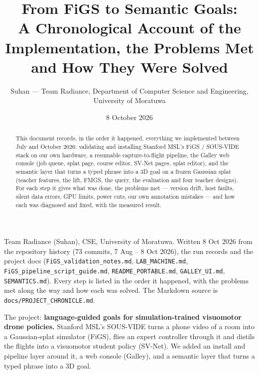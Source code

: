 \documentclass[11pt,a4paper]{article}
\title{From FiGS to Semantic Goals:\\[2pt]
\large A Chronological Account of the Implementation, the Problems Met and How They Were Solved}
\author{Suhan --- Team Radiance, Department of Computer Science and Engineering,\\University of Moratuwa}
\date{8 October 2026}
\newcommand{\code}[1]{\texttt{#1}}
\begin{document}
\maketitle
\begin{abstract}
This document records, in the order it happened, everything we implemented between July and October 2026: validating
and installing Stanford MSL's FiGS / SOUS-VIDE stack on our own hardware, a resumable capture-to-flight pipeline, the
Galley web console (job queue, splat page, course editor, SV-Net pages, splat editor), and the semantic layer that turns
a typed phrase into a 3D goal on a frozen Gaussian splat (teacher features, the lift, FMGS, the query, the evaluation
and four teacher designs). For each step it gives what was done, the problems met --- version drift, host faults,
silent data errors, GPU limits, power cuts, our own annotation mistakes --- and how each was diagnosed and fixed, with
the measured result.
\end{abstract}
\tableofcontents
\newpage
Team Radiance (Suhan), CSE, University of Moratuwa. Written 8 Oct 2026 from the repository history (73 commits, 7 Aug – 8 Oct 2026), the run records and the project docs (\code{FiGS\_\allowbreak{}validation\_\allowbreak{}notes.md}, \code{LAB\_\allowbreak{}MACHINE.md}, \code{FiGS\_\allowbreak{}pipeline\_\allowbreak{}script\_\allowbreak{}guide.md}, \code{README\_\allowbreak{}PORTABLE.md}, \code{GALLEY\_\allowbreak{}UI.md}, \code{SEMANTICS.md}). Every step is listed in the order it happened, with the problems met along the way and how each was solved. The Markdown source is \code{docs/PROJECT\_CHRONICLE.md}.

The project: \textbf{language-guided goals for simulation-trained visuomotor drone policies.} Stanford MSL's SOUS-VIDE turns a phone video of a room into a Gaussian-splat simulator (FiGS), flies an expert controller through it and distils the flights into a visuomotor student policy (SV-Net). We added an install and pipeline layer around it, a web console (Galley), and a semantic layer that turns a typed phrase into a 3D goal.
\end{document}
